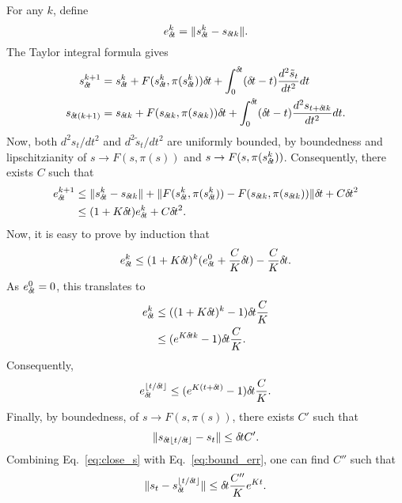 For any $k$, define
\begin{equation}
	e_{\delta\hspace{-.1em}t}^k = \|s_{\delta\hspace{-.1em}t}^k - s_{{\delta\hspace{-.1em}t} k}\|.
\end{equation}
The Taylor integral formula gives 
\begin{align}
	s_{\delta\hspace{-.1em}t}^{k + 1} &= s_{\delta\hspace{-.1em}t}^k + F(s_{\delta\hspace{-.1em}t}^k, \pi(s_{\delta\hspace{-.1em}t}^k)) {\delta\hspace{-.1em}t} +
	\int_{0}^{\delta\hspace{-.1em}t} ({\delta\hspace{-.1em}t} - t) \frac{d^2 \tilde{s}_t}{dt^2} dt\\
	s_{{\delta\hspace{-.1em}t}(k + 1)} &= s_{{\delta\hspace{-.1em}t} k} + F(s_{{\delta\hspace{-.1em}t} k}, \pi(s_{{\delta\hspace{-.1em}t} k})) {\delta\hspace{-.1em}t} +
	\int_0^{\delta\hspace{-.1em}t} ({\delta\hspace{-.1em}t} - t) \frac{d^2 s_{t + {\delta\hspace{-.1em}t} k}}{dt^2} dt.
\end{align}
Now, both $d^2 s_t/dt^2$ and $d^2 \tilde{s}_t/dt^2$ are uniformly bounded, by
boundedness and lipschitzianity of $s \rightarrow F(s, \pi(s))$ and $s
\rightarrow F(s, \pi(s_{\delta\hspace{-.1em}t}^k))$. Consequently, there exists $C$ such that
\begin{align}
	e_{\delta\hspace{-.1em}t}^{k + 1} &\leq \|s_{\delta\hspace{-.1em}t}^k - s_{{\delta\hspace{-.1em}t} k}\| + \|F(s_{\delta\hspace{-.1em}t}^k, \pi(s_{\delta\hspace{-.1em}t}^k)) - F(s_{{\delta\hspace{-.1em}t} k}, \pi(s_{{\delta\hspace{-.1em}t} k}))\| {\delta\hspace{-.1em}t} + C {\delta\hspace{-.1em}t}^2\\
			  &\leq (1 + K {\delta\hspace{-.1em}t}) e_{\delta\hspace{-.1em}t}^k + C {\delta\hspace{-.1em}t}^2.
\end{align}
Now, it is easy to prove by induction that
\begin{equation}
	e_{\delta\hspace{-.1em}t}^k \leq (1 + K {\delta\hspace{-.1em}t})^k (e_{\delta\hspace{-.1em}t}^0 + \frac{C}{K} {\delta\hspace{-.1em}t}) - \frac{C}{K}{\delta\hspace{-.1em}t}.
\end{equation}
As $e_{\delta\hspace{-.1em}t}^0 = 0$, this translates to
\begin{align}
	e_{\delta\hspace{-.1em}t}^k &\leq ((1 + K {\delta\hspace{-.1em}t})^k - 1) {\delta\hspace{-.1em}t} \frac{C}{K}\\
		    &\leq (e^{K {\delta\hspace{-.1em}t} k} - 1) {\delta\hspace{-.1em}t} \frac{C}{K}.
\end{align}
Consequently,
\begin{equation}
	e_{\delta\hspace{-.1em}t}^{\lfloor t / {\delta\hspace{-.1em}t} \rfloor} \leq (e^{K(t + {\delta\hspace{-.1em}t})} - 1) {\delta\hspace{-.1em}t} \frac{C}{K}.
	\label{eq:bound_err}
\end{equation}
Finally, by boundedness, of $s \rightarrow F(s, \pi(s))$, there exists $C'$ such that
\begin{equation}
	\|s_{{\delta\hspace{-.1em}t}\lfloor t / {\delta\hspace{-.1em}t} \rfloor} - s_t \| \leq {\delta\hspace{-.1em}t} C'.
	\label{eq:close_s}
\end{equation}
Combining Eq.~\eqref{eq:close_s} with Eq.~\eqref{eq:bound_err}, one can find $C''$ such that
\begin{equation}
	\|s_t - s_{\delta\hspace{-.1em}t}^{\lfloor t / {\delta\hspace{-.1em}t} \rfloor}\| \leq {\delta\hspace{-.1em}t} \frac{C''}{K} e^{Kt}.
\end{equation}
